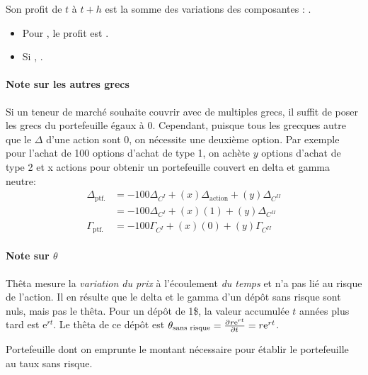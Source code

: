 \documentclass[10pt, french]{article}
\begin{document}
\begin{multicols*}{2}
Son profit de $t$ à $t + h$ est la somme des variations des composantes : .
\begin{itemize}
	\item	Pour , le profit est .
	\item	Si , .
\end{itemize}

\paragraph{Note sur les autres grecs}	Si un teneur de marché souhaite couvrir avec de multiples grecs, il suffit de poser les grecs du portefeuille égaux à 0. Cependant, puisque tous les grecques autre que le $\Delta$ d'une action sont 0, on nécessite une deuxième option. Par exemple pour l'achat de 100 options d'achat de type 1, on achète $y$ options d'achat de type 2 et x actions pour obtenir un portefeuille couvert en delta et gamma neutre:
\begin{align*}
	\Delta_{\text{ptf.}}
	&=	-100 \Delta_{C^{I}} + (x)\Delta_{\text{action}} + (y)\Delta_{C^{II}}	\\
	&=	-100 \Delta_{C^{I}} + (x)(1) + (y)\Delta_{C^{II}}	\\
	\Gamma_{\text{ptf.}}
	&=	-100 \Gamma_{C^{I}} + (x)(0) + (y)\Gamma_{C^{II}}	
\end{align*}

\paragraph{Note sur $\theta$} Thêta mesure la \textit{variation du prix} à l'écoulement \textit{du temps} et n'a pas lié au risque de l'action. Il en résulte que le delta et le gamma d'un dépôt sans risque sont nuls, mais pas le thêta. Pour un dépôt de 1\$, la valeur accumulée $t$ années plus tard est $\textrm{e}^{rt}$. Le thêta de ce dépôt est $\theta_{\text{sans risque}}	=	\deriv{t}{r\textrm{e}^{rt}}	=	r\textrm{e}^{rt}$. 

\begin{definitionNOHFILL}
Portefeuille dont on emprunte le montant nécessaire pour établir le portefeuille au taux sans risque.
\end{definitionNOHFILL}



\end{multicols*}
\end{document}
